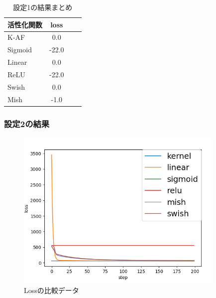 \begin{table}[htbp]
    \begin{center}
        \caption{設定1の結果まとめ}
        \vspace{5mm} 
        \begin{tabular}{l*{2}{c}r}
            活性化関数              & loss \\
            \hline
            K-AF            & 0.0 \\
            Sigmoid            & -22.0 \\
            Linear            & 0.0 \\
            ReLU        & -22.0 \\
            Swish           & 0.0 \\
            Mish           & -1.0 \\
    
        \end{tabular}
    \end{center}
\end{table}

\subsubsection{設定2の結果}

\begin{figure}[hbtp]
    \begin{center}
        \includegraphics[width=10cm]{asset/boston_0000001_SGDkaiming_normal__non_200.png}
            \caption{Lossの比較データ}
            \label{boston}
    \end{center}
\end{figure}



